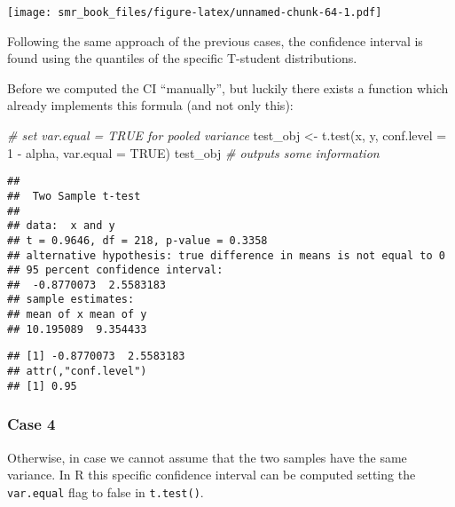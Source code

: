 \documentclass[
  oneside]{book}
\newenvironment{Shaded}{\begin{snugshade}}{\end{snugshade}}
\newcommand{\AttributeTok}[1]{\textcolor[rgb]{0.77,0.63,0.00}{#1}}
\newcommand{\CommentTok}[1]{\textcolor[rgb]{0.56,0.35,0.01}{\textit{#1}}}
\newcommand{\ConstantTok}[1]{\textcolor[rgb]{0.00,0.00,0.00}{#1}}
\newcommand{\DecValTok}[1]{\textcolor[rgb]{0.00,0.00,0.81}{#1}}
\newcommand{\FunctionTok}[1]{\textcolor[rgb]{0.00,0.00,0.00}{#1}}
\newcommand{\NormalTok}[1]{#1}
\newcommand{\OtherTok}[1]{\textcolor[rgb]{0.56,0.35,0.01}{#1}}
\newcommand{\SpecialCharTok}[1]{\textcolor[rgb]{0.00,0.00,0.00}{#1}}
\begin{document}
\texttt{[image: smr\_book\_files/figure-latex/unnamed-chunk-64-1.pdf]}

Following the same approach of the previous cases, the confidence interval
is found using the quantiles of the specific T-student distributions.

Before we computed the CI ``manually'', but luckily there exists a function which already implements this formula
(and not only this):

\begin{Shaded}
\begin{Highlighting}[]
\CommentTok{\# set var.equal = TRUE for pooled variance}
\NormalTok{test\_obj }\OtherTok{\textless{}{-}} \FunctionTok{t.test}\NormalTok{(x, y, }\AttributeTok{conf.level =} \DecValTok{1} \SpecialCharTok{{-}}\NormalTok{ alpha, }\AttributeTok{var.equal =} \ConstantTok{TRUE}\NormalTok{)}
\NormalTok{test\_obj }\CommentTok{\# outputs some information}
\end{Highlighting}
\end{Shaded}

\begin{verbatim}
## 
##  Two Sample t-test
## 
## data:  x and y
## t = 0.9646, df = 218, p-value = 0.3358
## alternative hypothesis: true difference in means is not equal to 0
## 95 percent confidence interval:
##  -0.8770073  2.5583183
## sample estimates:
## mean of x mean of y 
## 10.195089  9.354433
\end{verbatim}

\begin{Shaded}
\end{Shaded}

\begin{verbatim}
## [1] -0.8770073  2.5583183
## attr(,"conf.level")
## [1] 0.95
\end{verbatim}

\hypertarget{case-4}{%
\subsubsection{Case 4}\label{case-4}}

Otherwise, in case we cannot assume that the two samples have the same variance.
In R this specific confidence interval can be computed setting the \texttt{var.equal}
flag to false in \texttt{t.test()}.
\end{document}
